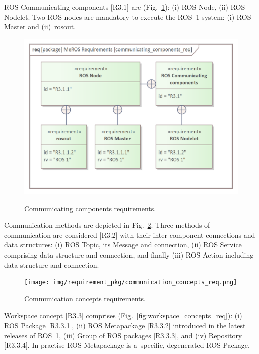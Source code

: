 \documentclass[11pt,oneside,a4paper]{report}
\begin{document}
	ROS Communicating components [R3.1] are (Fig.~\ref{fig:communicating_components_req}): (i) ROS Node, (ii) ROS Nodelet. Two ROS nodes are mandatory to execute the ROS~1 system: (i) ROS Master and (ii)~rosout.

	\begin{figure}[H]
		\centering
		\begin{center}
			{\includegraphics[scale=1.1]{img/requirement_pkg/communicating_components_req.png}}
		\end{center}
		\caption{Communicating components requirements.} 
		\label{fig:communicating_components_req}
	\end{figure}
	
	\pagebreak
	
	Communication methods are depicted in Fig.~\ref{fig:communication_concepts_req}.
	 Three methods of communication are considered [R3.2] with their inter-component connections and data structures: (i) ROS Topic, its Message and connection, (ii) ROS Service comprising data structure and connection, and finally (iii) ROS Action including data structure and connection.
	
	\begin{figure}[H]
		\centering
		\begin{center}
			{\texttt{[image: img/requirement\_pkg/communication\_concepts\_req.png]}}
		\end{center}
		\caption{Communication concepts requirements.} 
		\label{fig:communication_concepts_req}
	\end{figure}
	
	Workspace concept [R3.3] comprises (Fig.~\ref{fig:workspace_concepts_req}): (i) ROS Package [R3.3.1], (ii) ROS Metapackage [R3.3.2] introduced in the latest releases of ROS~1, (iii) Group of ROS packages [R3.3.3], and (iv) Repository [R3.3.4]. In practise ROS Metapackage is a~specific, degenerated ROS Package.
	
\end{document}
